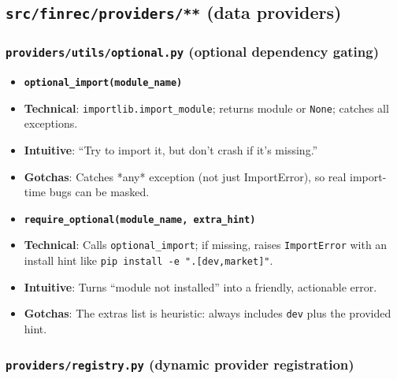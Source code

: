 \documentclass[11pt]{article}
\begin{document}
\subsection{\texttt{src/finrec/providers/**} (data providers)}


\subsubsection{\texttt{providers/utils/optional.py} (optional dependency gating)}

\begin{itemize}[leftmargin=*,nosep]
\item \textbf{\texttt{optional\_import(module\_name)}}
\item \textbf{Technical}: \texttt{importlib.import\_module}; returns module or \texttt{None}; catches all exceptions.
\item \textbf{Intuitive}: “Try to import it, but don’t crash if it’s missing.”
\item \textbf{Gotchas}: Catches *any* exception (not just ImportError), so real import-time bugs can be masked.
\item \textbf{\texttt{require\_optional(module\_name, extra\_hint)}}
\item \textbf{Technical}: Calls \texttt{optional\_import}; if missing, raises \texttt{ImportError} with an install hint like \texttt{pip install -e ".[dev,market]"}.
\item \textbf{Intuitive}: Turns “module not installed” into a friendly, actionable error.
\item \textbf{Gotchas}: The extras list is heuristic: always includes \texttt{dev} plus the provided hint.
\end{itemize}


\subsubsection{\texttt{providers/registry.py} (dynamic provider registration)}
\end{document}
